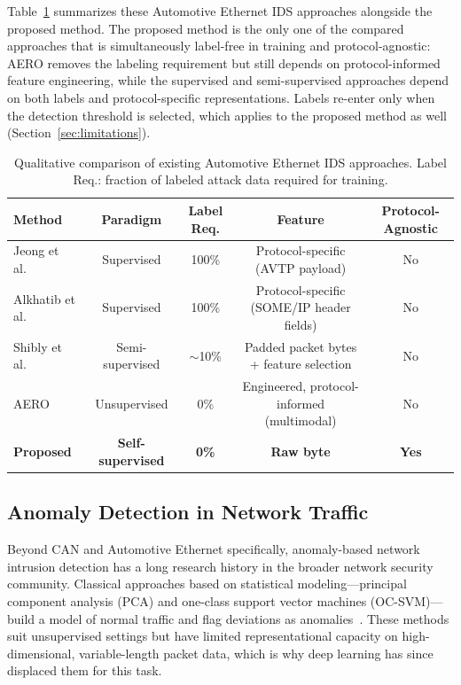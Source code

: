 Table~\ref{tab:relatedwork_ae} summarizes these Automotive Ethernet IDS approaches alongside the proposed method. The proposed method is the only one of the compared approaches that is simultaneously label-free in training and protocol-agnostic: AERO removes the labeling requirement but still depends on protocol-informed feature engineering, while the supervised and semi-supervised approaches depend on both labels and protocol-specific representations. Labels re-enter only when the detection threshold is selected, which applies to the proposed method as well (Section~\ref{sec:limitations}).

\begin{table}[!tbp]
\centering
\caption{Qualitative comparison of existing Automotive Ethernet IDS approaches. Label Req.: fraction of labeled attack data required for training.}
\label{tab:relatedwork_ae}
\footnotesize
\begin{tabular}{lcccc}
\toprule
\textbf{Method} & \textbf{Paradigm} & \textbf{Label Req.} & \textbf{Feature} & \textbf{Protocol-Agnostic} \\
\midrule
Jeong et al.~\cite{jeong2021convolutional} & Supervised & 100\% & Protocol-specific (AVTP payload) & No \\
Alkhatib et al.~\cite{alkhatib2021some} & Supervised & 100\% & Protocol-specific (SOME/IP header fields) & No \\
Shibly et al.~\cite{shibly2023feature} & Semi-supervised & $\sim$10\% & Padded packet bytes + feature selection & No \\
AERO~\cite{jeong2023aero} & Unsupervised & 0\% & Engineered, protocol-informed (multimodal) & No \\
\textbf{Proposed} & \textbf{Self-supervised} & \textbf{0\%} & \textbf{Raw byte} & \textbf{Yes} \\
\bottomrule
\end{tabular}
\end{table}

\subsection{Anomaly Detection in Network Traffic}
Beyond CAN and Automotive Ethernet specifically, anomaly-based network intrusion detection has a long research history in the broader network security community. Classical approaches based on statistical modeling---principal component analysis (PCA) and one-class support vector machines (OC-SVM)---build a model of normal traffic and flag deviations as anomalies~\cite{chandola2009anomaly}. These methods suit unsupervised settings but have limited representational capacity on high-dimensional, variable-length packet data, which is why deep learning has since displaced them for this task.

